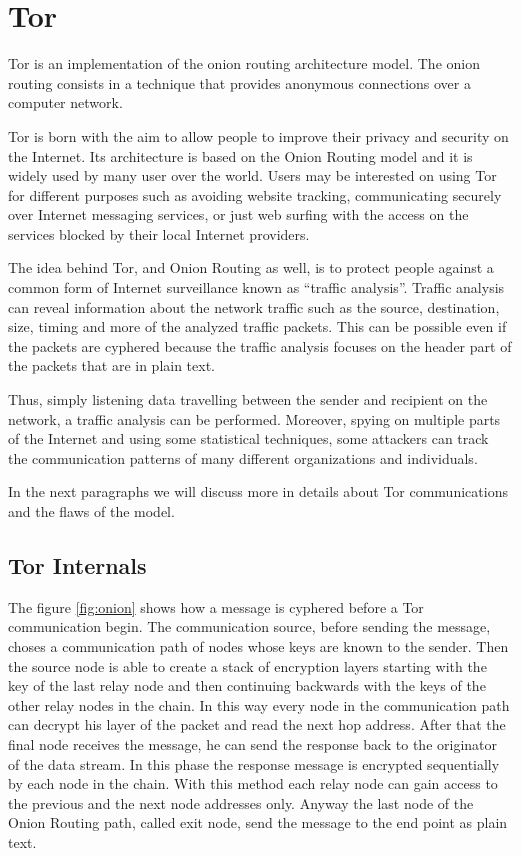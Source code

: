 \section{Tor}
\label{sec:tor}

Tor is an implementation of the onion routing architecture model. The
onion routing consists in a technique that provides anonymous
connections over a computer network\cite{goldschlag1999onion}.

Tor is born with the aim to allow people to
improve their privacy and security on the Internet. Its architecture is
based on the Onion Routing model and it is widely used by many user over
the world. Users may be interested on using Tor for different purposes
such as avoiding website tracking, communicating securely over Internet
messaging services, or just web surfing with the access on the services
blocked by their local Internet providers.

The idea behind Tor, and Onion Routing as well, is to protect people
against a common form of Internet surveillance known as ``traffic
analysis''. Traffic analysis can reveal information about the network
traffic such as the source, destination, size, timing and more of the
analyzed traffic packets. This can be possible even if the packets are
cyphered because the traffic analysis focuses on the header part of the
packets that are in plain text. 

Thus, simply listening data travelling between the sender and recipient on the network,
a traffic analysis can be performed. Moreover, spying on multiple parts
of the Internet and using some statistical techniques, some attackers can
track the communication patterns of many different organizations and
individuals.

In the next paragraphs we will discuss more in details about Tor communications 
and the flaws of the model.

\subsection{Tor Internals}
The figure \ref{fig:onion} shows how a
message is cyphered before a Tor communication begin. The communication
source, before sending the message, choses a communication path of nodes
whose keys are known to the sender.
Then the source node is able to create a stack of encryption layers starting
with the key of the last relay node and then continuing backwards with
the keys of the other relay nodes in the chain. In this way every node
in the communication path can decrypt his layer of the packet and read the next hop
address. After that the final node receives the message, he can send the
response back to the originator of the data stream. In this phase the response
message is encrypted sequentially by each node in the chain. 
With this method each relay node can gain access to the
previous and the next node addresses only. Anyway the last node of the
Onion Routing path, called exit node, send the message to the end point
as plain text.

